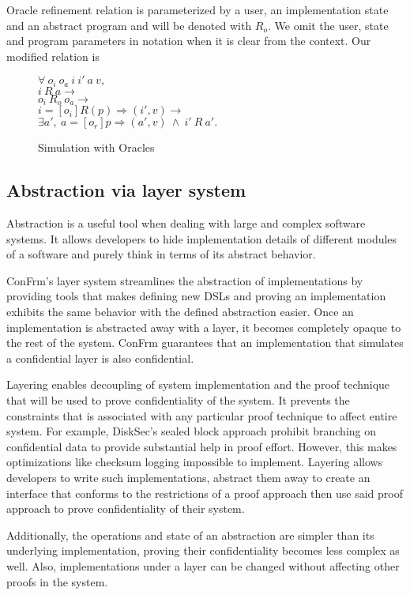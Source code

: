 Oracle refinement relation is parameterized by a user, an implementation state and an abstract program and will be denoted with $R_o$. We omit the user, state and program parameters in notation when it is clear from the context. Our modified relation is

\begin{figure}[H]
$\forall\ o_i\ o_a\ i\ i'\ a\ v,$\\
$i\ R\ a \rightarrow$\\
$o_i\ R_o\ o_a \rightarrow$\\
$i =[o_i] R(p)\Rightarrow (i', v) \rightarrow$\\
$\exists a',\ a =[o_r] p\Rightarrow (a', v)\ \wedge\ i'\ R\ a'.$\\
	\caption{Simulation with Oracles}
\end{figure}

\subsection{Abstraction via layer system}
Abstraction is a useful tool when dealing with large and complex software systems.
It allows developers to hide implementation details of different modules of a software and purely think in terms of its abstract behavior.

ConFrm's layer system streamlines the abstraction of implementations by providing tools that makes defining new DSLs and proving an implementation exhibits the same behavior with the defined abstraction easier. Once an implementation is abstracted away with a layer, it becomes completely opaque to the rest of the system. ConFrm guarantees that an implementation that simulates a confidential layer is also confidential.

Layering enables decoupling of system implementation and the proof technique that will be used to prove confidentiality of the system. It prevents the constraints that is associated with any particular proof technique to affect entire system. For example, DiskSec's sealed block approach prohibit branching on confidential data to provide substantial help in proof effort. However, this makes optimizations like checksum logging impossible to implement. Layering allows developers to write such implementations, abstract them away to create an interface that conforms to the restrictions of a proof approach then use said proof approach to prove confidentiality of their system.

Additionally, the operations and state of an abstraction are simpler than its underlying implementation, proving their confidentiality becomes less complex as well. Also, implementations under a layer can be changed without affecting other proofs in the system.

